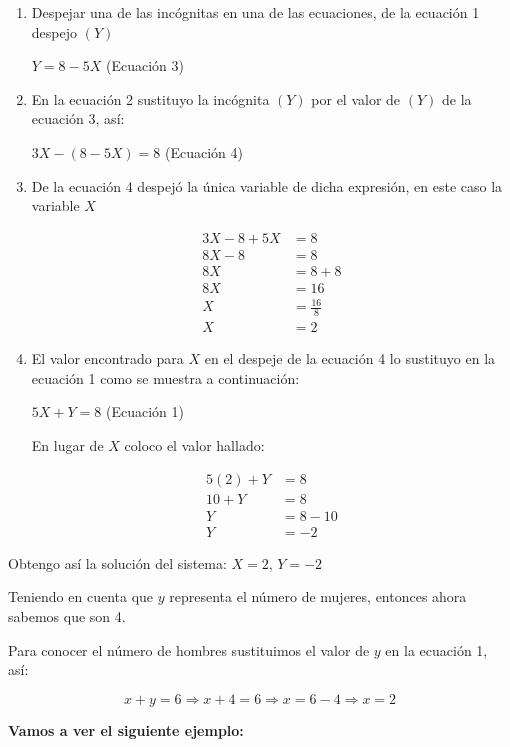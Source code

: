 \documentclass[12pt,a4paper]{article}
\begin{document}
\begin{enumerate}
    \item Despejar una de las incógnitas en una de las ecuaciones, de la ecuación 1 despejo $(Y)$

    $Y = 8 - 5X$ (Ecuación 3)

    \item En la ecuación 2 sustituyo la incógnita $(Y)$ por el valor de $(Y)$ de la ecuación 3, así:

    $3X - (8 - 5X) = 8$ (Ecuación 4)

    \item De la ecuación 4 despejó la única variable de dicha expresión, en este caso la variable $X$

    \begin{align*}
    3X - 8 + 5X &= 8 \\
    8X - 8 &= 8 \\
    8X &= 8 + 8 \\
    8X &= 16 \\
    X &= \frac{16}{8} \\
    X &= 2
    \end{align*}

    \item El valor encontrado para $X$ en el despeje de la ecuación 4 lo sustituyo en la ecuación 1 como se muestra a continuación:

    $5X + Y = 8$ (Ecuación 1)

    En lugar de $X$ coloco el valor hallado:

    \begin{align*}
    5(2) + Y &= 8 \\
    10 + Y &= 8 \\
    Y &= 8 - 10 \\
    Y &= -2
    \end{align*}
\end{enumerate}

Obtengo así la solución del sistema: $X = 2$, $Y = -2$

Teniendo en cuenta que $y$ representa el número de mujeres, entonces ahora sabemos que son 4.

Para conocer el número de hombres sustituimos el valor de $y$ en la ecuación 1, así:

\[ x + y = 6 \Rightarrow x + 4 = 6 \Rightarrow x = 6 - 4 \Rightarrow x = 2 \]

\vspace{1cm}

\textbf{Vamos a ver el siguiente ejemplo:}
\end{document}
